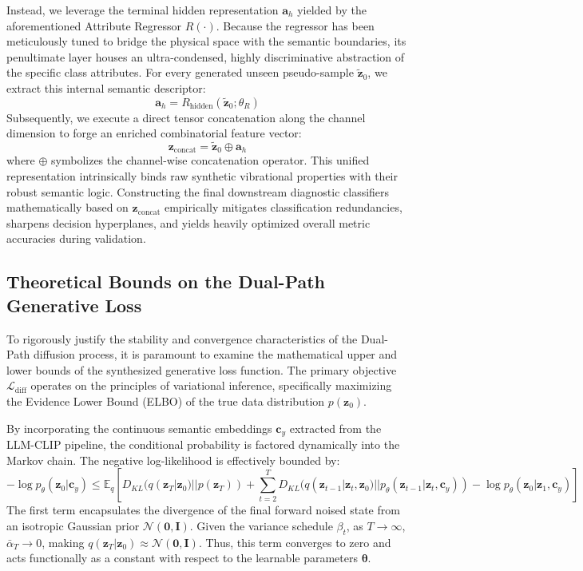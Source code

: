 Instead, we leverage the terminal hidden representation $\mathbf{a}_h$ yielded by the aforementioned Attribute Regressor $R(\cdot)$. Because the regressor has been meticulously tuned to bridge the physical space with the semantic boundaries, its penultimate layer houses an ultra-condensed, highly discriminative abstraction of the specific class attributes. For every generated unseen pseudo-sample $\tilde{\mathbf{z}}_0$, we extract this internal semantic descriptor:
\begin{equation}
\mathbf{a}_h = R_{\text{hidden}}(\tilde{\mathbf{z}}_0; \theta_{R})
\end{equation}
Subsequently, we execute a direct tensor concatenation along the channel dimension to forge an enriched combinatorial feature vector:
\begin{equation}
\mathbf{z}_{\text{concat}} = \tilde{\mathbf{z}}_0 \oplus \mathbf{a}_h
\end{equation}
where $\oplus$ symbolizes the channel-wise concatenation operator. This unified representation intrinsically binds raw synthetic vibrational properties with their robust semantic logic. Constructing the final downstream diagnostic classifiers mathematically based on $\mathbf{z}_{\text{concat}}$ empirically mitigates classification redundancies, sharpens decision hyperplanes, and yields heavily optimized overall metric accuracies during validation.

\subsection{Theoretical Bounds on the Dual-Path Generative Loss}
\label{subsec:theoretical_bounds}
To rigorously justify the stability and convergence characteristics of the Dual-Path diffusion process, it is paramount to examine the mathematical upper and lower bounds of the synthesized generative loss function. The primary objective $\mathcal{L}_{\text{diff}}$ operates on the principles of variational inference, specifically maximizing the Evidence Lower Bound (ELBO) of the true data distribution $p(\mathbf{z}_0)$.

By incorporating the continuous semantic embeddings $\mathbf{c}_y$ extracted from the LLM-CLIP pipeline, the conditional probability is factored dynamically into the Markov chain. The negative log-likelihood is effectively bounded by:
\begin{equation}
-\log p_{\theta}(\mathbf{z}_0 | \mathbf{c}_y) \leq \mathbb{E}_{q}\left[ D_{KL}(q(\mathbf{z}_T | \mathbf{z}_0) || p(\mathbf{z}_T)) + \sum_{t=2}^{T} D_{KL}(q(\mathbf{z}_{t-1} | \mathbf{z}_t, \mathbf{z}_0) || p_{\theta}(\mathbf{z}_{t-1} | \mathbf{z}_t, \mathbf{c}_y)) - \log p_{\theta}(\mathbf{z}_0 | \mathbf{z}_1, \mathbf{c}_y) \right]
\end{equation}
The first term encapsulates the divergence of the final forward noised state from an isotropic Gaussian prior $\mathcal{N}(\mathbf{0}, \mathbf{I})$. Given the variance schedule $\beta_t$, as $T \rightarrow \infty$, $\bar{\alpha}_T \rightarrow 0$, making $q(\mathbf{z}_T | \mathbf{z}_0) \approx \mathcal{N}(\mathbf{0}, \mathbf{I})$. Thus, this term converges to zero and acts functionally as a constant with respect to the learnable parameters $\boldsymbol{\theta}$.
    
